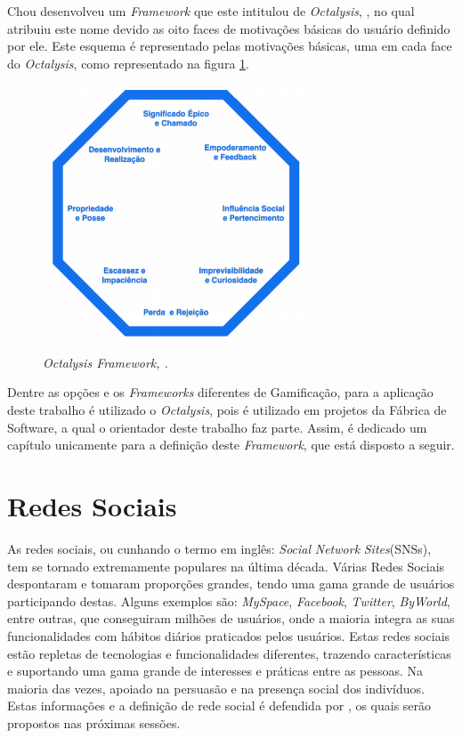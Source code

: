 Chou desenvolveu um \textit{Framework} que este intitulou de \textit{Octalysis}, \cite{chou2015actionable}, no qual atribuiu
este nome devido as oito faces de motivações básicas do usuário definido por ele.
Este esquema é representado pelas motivações básicas, uma em cada face do \textit{Octalysis},
como representado na figura \ref{fig:octalysisex}.

\begin{figure}[h]
    \centering
    \includegraphics[width=300px, scale=1]{figuras/octalysisex}
    \caption{\textit{Octalysis Framework, \cite{chou2015actionable}.}}
    \label{fig:octalysisex}
\end{figure}

Dentre as opções e os \textit{Frameworks} diferentes de Gamificação, para a aplicação
deste trabalho é utilizado o \textit{Octalysis}, pois é utilizado em projetos da Fábrica de
Software, a qual o orientador deste trabalho faz parte. Assim, é dedicado um capítulo
unicamente para a definição deste \textit{Framework}, que está disposto a seguir.



\section{Redes Sociais}
\label{sec:redessociais}
As redes sociais, ou cunhando o termo em inglês: \textit{Social} \textit{Network} \textit{Sites}(SNSs),
tem se tornado extremamente populares na última década. 
Várias
Redes Sociais despontaram e tomaram proporções grandes, tendo uma gama grande
de usuários participando destas. Alguns exemplos são: \textit{MySpace}, \textit{Facebook}, \textit{Twitter},
\textit{ByWorld}, entre outras, que conseguiram milhões de usuários, onde a maioria integra
as suas funcionalidades com hábitos diários praticados pelos usuários.
Estas redes sociais estão repletas de tecnologias e funcionalidades diferentes,
trazendo características e suportando uma gama grande de interesses e práticas
entre as pessoas. Na maioria das vezes, apoiado na persuasão e na presença social
dos indivíduos. Estas informações e a definição de rede social é defendida por
\cite{socialnetworkdefinition}, os quais serão propostos nas próximas sessões.

